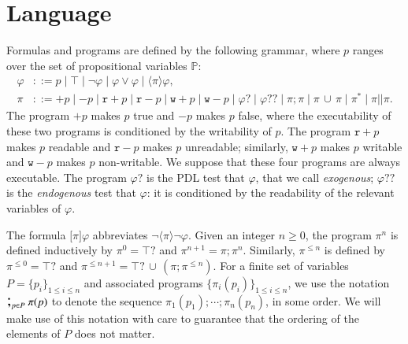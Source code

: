 \documentclass{llncs}
\newcommand{\atm}{x}
\newcommand{\pll}{ {||} }							%
\newcommand{\testendo}{?\!\!?}			%
\newcommand{\testpdl}{?}				%
\newcommand{\ah}[1]{\**\marginpar{\textbf{AH:} #1}}
\newcommand{\assgn}[2]{{#1 {:=} #2}}
\newcommand{\assgntopR}[1]{{\mathtt r {+} #1}}
\newcommand{\assgnbotR}[1]{{\mathtt r {-} #1}}
\newcommand{\assgntopW}[1]{{\mathtt w {+} #1}}
\newcommand{\assgnbotW}[1]{{\mathtt w {-} #1}}
\newcommand{\assgntopV}[1]{{\mathtt {+} #1}}
\newcommand{\assgnbotV}[1]{{\mathtt {-} #1}}
\newcommand{\ifthen}[2]{\mathbf{if}\ #1 \ \mathbf{then}\ #2}
\newcommand{\lbox}[1]{ \big[ #1 \big] }
\newcommand{\ldia}[1]{ \big\langle #1 \big\rangle}
\newcommand{\ndet}{\,{\cup}\,}
\renewcommand{\phi}{\varphi}
\newcommand{\propset}{\mathbb P}
\newcommand{\seqseq}[1]{ \text{\Large ;}_{#1} ~ }
\begin{document}
\section{Language}\label{sec:language}

Formulas and programs are defined by the following grammar,
where $p$ ranges over the set of propositional variables $\propset$:
\begin{align*}
\phi & ::= p \mid \top  \mid  \lnot \phi  \mid  \phi \lor \phi  \mid  \ldia \pi \phi ,
\\
\pi & ::= \assgntopV p \mid \assgnbotV p \mid
		\assgntopR p \mid \assgnbotR p \mid
		\assgntopW p \mid \assgnbotW p \mid
			\phi \testpdl \mid 
			\phi \testendo \mid 
			\pi ; \pi \mid \pi \ndet \pi \mid 
			\pi^\ast \mid \pi \pll \pi .
\end{align*}
The program $\assgntopV p$ makes $p$ true and $\assgnbotV p $ makes $p$ false, where the executability of these two programs is conditioned by the writability of $p$. 
%
The program $\assgntopR p$ makes $p$ readable and 
$\assgnbotR p $ makes $p$ unreadable; similarly,
$\assgntopW p$ makes $p$ writable and 
$\assgnbotW p$ makes $p$ non-writable.
We suppose that these four programs are always executable. 
The program $\phi \testpdl$ is the PDL test that $\phi$, that we call \emph{exogenous};
$\phi \testendo $ is the \emph{endogenous} test that $\phi$: it is 
conditioned by the readability of the relevant variables of $\phi$. 

The formula $\lbox \pi \phi$ abbreviates $\lnot \ldia \pi \lnot \phi$.
Given an integer $n \geq 0$, the program $\pi^n$ is defined inductively by 
$\pi^0 = \top \testpdl $ and 
$\pi^{n+1} = \pi ; \pi^n $. 
Similarly, $\pi^{\leq n}$ is defined by 
$\pi^{\leq 0} = \top \testpdl $ and 
$\pi^{\leq n+1} = \top \testpdl \ndet (\pi ; \pi^{\leq n}) $. 
For a finite set of variables 
$P = \{p_i\}_{1 \leq  i \leq n}$ 
and associated programs 
$\{ \pi_i(p_i)\}_{1 \leq  i \leq n}$,
we use the notation
$\seqseq{p \in P} \pi(p)$ to denote the sequence
$ \pi_1(p_1) ; \cdots ; \pi_n(p_n)$, in some order. 
We will make use of this notation with care to guarantee that the ordering of the elements of $P$ does not matter. 
\end{document}
